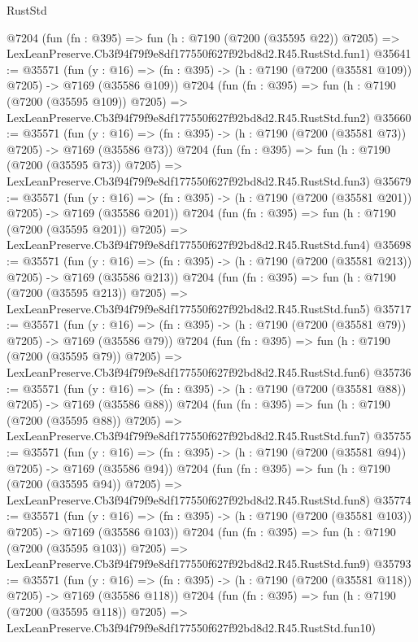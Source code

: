 \begin{lexlean}{RustStd}
\begin{coremodule}
    @7204
    (fun (fn : @395) =>
    fun (h : @7190 (@7200 (@35595 @22)) @7205) =>
    LexLeanPreserve.Cb3f94f79f9e8df177550f627f92bd8d2.R45.RustStd.fun1)
@35641 := @35571
    (fun (y : @16) => (fn : @395) -> (h : @7190 (@7200 (@35581 @109)) @7205) -> @7169 (@35586 @109))
    @7204
    (fun (fn : @395) =>
    fun (h : @7190 (@7200 (@35595 @109)) @7205) =>
    LexLeanPreserve.Cb3f94f79f9e8df177550f627f92bd8d2.R45.RustStd.fun2)
@35660 := @35571
    (fun (y : @16) => (fn : @395) -> (h : @7190 (@7200 (@35581 @73)) @7205) -> @7169 (@35586 @73))
    @7204
    (fun (fn : @395) =>
    fun (h : @7190 (@7200 (@35595 @73)) @7205) =>
    LexLeanPreserve.Cb3f94f79f9e8df177550f627f92bd8d2.R45.RustStd.fun3)
@35679 := @35571
    (fun (y : @16) => (fn : @395) -> (h : @7190 (@7200 (@35581 @201)) @7205) -> @7169 (@35586 @201))
    @7204
    (fun (fn : @395) =>
    fun (h : @7190 (@7200 (@35595 @201)) @7205) =>
    LexLeanPreserve.Cb3f94f79f9e8df177550f627f92bd8d2.R45.RustStd.fun4)
@35698 := @35571
    (fun (y : @16) => (fn : @395) -> (h : @7190 (@7200 (@35581 @213)) @7205) -> @7169 (@35586 @213))
    @7204
    (fun (fn : @395) =>
    fun (h : @7190 (@7200 (@35595 @213)) @7205) =>
    LexLeanPreserve.Cb3f94f79f9e8df177550f627f92bd8d2.R45.RustStd.fun5)
@35717 := @35571
    (fun (y : @16) => (fn : @395) -> (h : @7190 (@7200 (@35581 @79)) @7205) -> @7169 (@35586 @79))
    @7204
    (fun (fn : @395) =>
    fun (h : @7190 (@7200 (@35595 @79)) @7205) =>
    LexLeanPreserve.Cb3f94f79f9e8df177550f627f92bd8d2.R45.RustStd.fun6)
@35736 := @35571
    (fun (y : @16) => (fn : @395) -> (h : @7190 (@7200 (@35581 @88)) @7205) -> @7169 (@35586 @88))
    @7204
    (fun (fn : @395) =>
    fun (h : @7190 (@7200 (@35595 @88)) @7205) =>
    LexLeanPreserve.Cb3f94f79f9e8df177550f627f92bd8d2.R45.RustStd.fun7)
@35755 := @35571
    (fun (y : @16) => (fn : @395) -> (h : @7190 (@7200 (@35581 @94)) @7205) -> @7169 (@35586 @94))
    @7204
    (fun (fn : @395) =>
    fun (h : @7190 (@7200 (@35595 @94)) @7205) =>
    LexLeanPreserve.Cb3f94f79f9e8df177550f627f92bd8d2.R45.RustStd.fun8)
@35774 := @35571
    (fun (y : @16) => (fn : @395) -> (h : @7190 (@7200 (@35581 @103)) @7205) -> @7169 (@35586 @103))
    @7204
    (fun (fn : @395) =>
    fun (h : @7190 (@7200 (@35595 @103)) @7205) =>
    LexLeanPreserve.Cb3f94f79f9e8df177550f627f92bd8d2.R45.RustStd.fun9)
@35793 := @35571
    (fun (y : @16) => (fn : @395) -> (h : @7190 (@7200 (@35581 @118)) @7205) -> @7169 (@35586 @118))
    @7204
    (fun (fn : @395) =>
    fun (h : @7190 (@7200 (@35595 @118)) @7205) =>
    LexLeanPreserve.Cb3f94f79f9e8df177550f627f92bd8d2.R45.RustStd.fun10)

\end{coremodule}
\end{lexlean}
